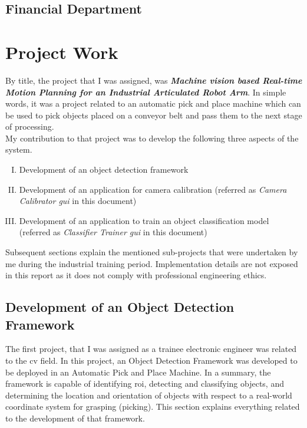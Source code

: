 \documentclass[a4paper,12pt]{report}%
\begin{document}
\section{Financial Department}

\chapter{Project Work}

By title, the project that I was assigned, was \textbf{\textit{Machine vision based Real-time Motion Planning for an Industrial Articulated Robot Arm}}. In simple words, it was a project related to an automatic pick and place machine which can be used to pick objects placed on a conveyor belt and pass them to the next stage of processing.\\

My contribution to that project was to develop the following three aspects of the system. 

\begin{enumerate}[I.]
	\item Development of an object detection framework
	
	\item Development of an application for camera calibration (referred as \textit{Camera Calibrator \ac{gui}} in this document)
	
	\item Development of an application to train an object classification model (referred as \textit{Classifier Trainer \ac{gui}} in this document)
	
\end{enumerate}

Subsequent sections explain the mentioned sub-projects that were undertaken by me during the industrial training period. Implementation details are not exposed in this report as it does not comply with professional engineering ethics.


\pagebreak
\section{Development of an Object Detection Framework}
\label{Development of an Object Detection Framework}
The first project, that I was assigned as a trainee electronic engineer was related to the \ac{cv} field. In this project, an Object Detection Framework was developed to be deployed in an Automatic Pick and Place Machine. In a summary, the framework is capable of identifying \ac{roi}, detecting and classifying objects, and determining the location and orientation of objects with respect to a real-world coordinate system for grasping (picking). This section explains everything related to the development of that framework.
\end{document}
